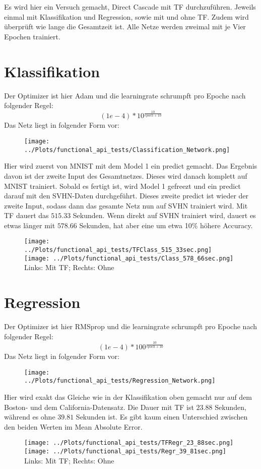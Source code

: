 Es wird hier ein Versuch gemacht, Direct Cascade mit TF 
durchzuführen. Jeweils einmal mit Klassifikation und Regression, 
sowie mit und ohne TF. Zudem wird überprüft wie lange die 
Gesamtzeit ist. Alle Netze werden zweimal mit je Vier Epochen 
trainiert. 

\section{Klassifikation}
Der Optimizer ist hier Adam und die learningrate schrumpft pro 
Epoche nach folgender Regel:
\begin{equation}
    (1e-4) * 10^{\frac{10}{epoch + 10}}
\end{equation}
Das Netz liegt in folgender Form vor: 
\begin{figure}[htpb]
    \texttt{[image: ../Plots/functional\_api\_tests/Classification\_Network.png]}
\end{figure}
Hier wird zuerst von MNIST mit dem Model 1 ein predict gemacht. Das Ergebnis davon 
ist der zweite Input des Gesamtnetzes. Dieses wird danach komplett 
auf MNIST trainiert. Sobald es fertigt ist, wird Model 1 gefreezt und 
ein predict darauf mit den SVHN-Daten durchgeführt. 
Dieses zweite predict ist wieder der zweite Input, sodass dann 
das gesamte Netz nun auf SVHN trainiert wird. Mit TF dauert das 
$515.33$ Sekunden. Wenn direkt auf SVHN trainiert wird, dauert es etwas 
länger mit $578.66$ Sekunden, hat aber eine um etwa 10\% höhere Accuracy.
\begin{figure}[htpb]
    \texttt{[image: ../Plots/functional\_api\_tests/TFClass\_515\_33sec.png]}
    \texttt{[image: ../Plots/functional\_api\_tests/Class\_578\_66sec.png]}
    Links: Mit TF; Rechts: Ohne
\end{figure}


\section{Regression}
Der Optimizer ist hier RMSprop und die learningrate schrumpft pro Epoche nach 
folgender Regel: 
\begin{equation}
    (1e-4) * 100^{\frac{10}{epoch + 10}}
\end{equation}
Das Netz liegt in folgender Form vor:
\begin{figure}[htpb]
    \texttt{[image: ../Plots/functional\_api\_tests/Regression\_Network.png]}
\end{figure}
Hier wird exakt das Gleiche wie in der Klassifikation oben gemacht nur auf dem 
Boston- und dem California-Datensatz. Die Dauer mit TF ist $23.88$ Sekunden, während 
es ohne $39.81$ Sekunden ist. Es gibt kaum einen Unterschied zwischen den beiden 
Werten im Mean Absolute Error.
\begin{figure}
    \texttt{[image: ../Plots/functional\_api\_tests/TFRegr\_23\_88sec.png]}
    \texttt{[image: ../Plots/functional\_api\_tests/Regr\_39\_81sec.png]}
    Links: Mit TF; Rechts: Ohne
\end{figure}